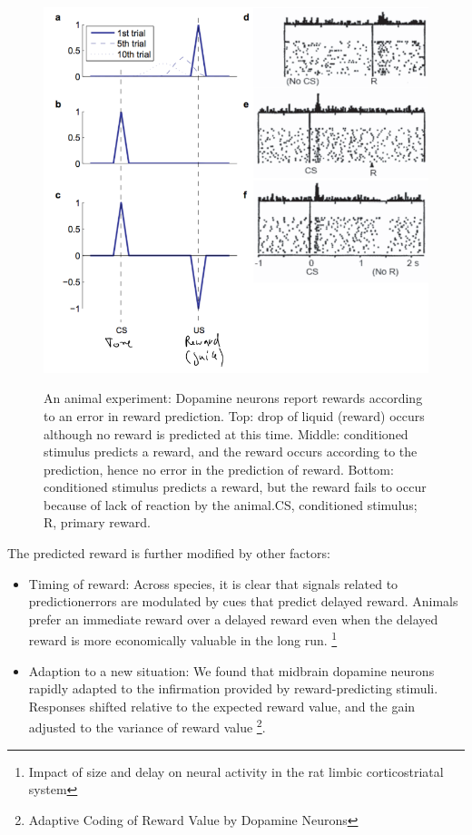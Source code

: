 \documentclass[main]{subfiles}
\begin{document}
\begin{figure}[H]
	\centering
	\includegraphics[width=0.9\linewidth]{08_ReinforcementLearning/figures/dopamine-rpe.png}
	\label{fig:dopamine-rpe}
	\caption{An animal experiment: Dopamine neurons report rewards according to an error in reward prediction. Top: drop of liquid (reward) occurs although no reward is predicted at this time. Middle: conditioned stimulus predicts a reward, and the reward occurs according to the prediction, hence no error in the prediction of reward. Bottom: conditioned stimulus predicts a reward, but the reward fails to occur because of lack of reaction by the animal.CS, conditioned stimulus; R, primary reward.}
\end{figure}

The predicted reward is further modified by other factors: 

\begin{itemize}
    \item Timing of reward: Across species, it is clear that signals related to predictionerrors are modulated by cues that predict delayed reward. Animals prefer an immediate reward over a delayed reward even when the delayed reward is more economically valuable in the long run. \footnote{Impact of size and delay on neural activity in the rat limbic corticostriatal system}
    \item Adaption to a new situation: We found that midbrain dopamine neurons rapidly adapted to the infirmation provided by reward-predicting stimuli. Responses shifted relative to the expected reward value, and the gain adjusted to the variance of reward value \footnote{Adaptive Coding of Reward Value by Dopamine Neurons}.
\end{itemize}
\end{document}
